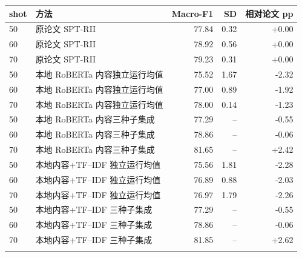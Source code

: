\begin{tabular}{llrrr}
\toprule
shot & 方法 & Macro-F1 & SD & 相对论文 pp\\
\midrule
50 & 原论文 SPT-RII & 77.84 & 0.32 & +0.00\\
60 & 原论文 SPT-RII & 78.92 & 0.56 & +0.00\\
70 & 原论文 SPT-RII & 79.23 & 0.31 & +0.00\\
50 & 本地 RoBERTa 内容独立运行均值 & 75.52 & 1.67 & -2.32\\
60 & 本地 RoBERTa 内容独立运行均值 & 77.00 & 0.89 & -1.92\\
70 & 本地 RoBERTa 内容独立运行均值 & 78.00 & 0.14 & -1.23\\
50 & 本地 RoBERTa 内容三种子集成 & 77.29 & -- & -0.55\\
60 & 本地 RoBERTa 内容三种子集成 & 78.86 & -- & -0.06\\
70 & 本地 RoBERTa 内容三种子集成 & 81.65 & -- & +2.42\\
50 & 本地内容+TF--IDF 独立运行均值 & 75.56 & 1.81 & -2.28\\
60 & 本地内容+TF--IDF 独立运行均值 & 76.89 & 0.88 & -2.03\\
70 & 本地内容+TF--IDF 独立运行均值 & 76.97 & 1.79 & -2.26\\
50 & 本地内容+TF--IDF 三种子集成 & 77.29 & -- & -0.55\\
60 & 本地内容+TF--IDF 三种子集成 & 78.86 & -- & -0.06\\
70 & 本地内容+TF--IDF 三种子集成 & 81.85 & -- & +2.62\\
\addlinespace
\multicolumn{5}{l}{\footnotesize 官方释义融合仅作标签近似信息的上限参考，不纳入主结论。}\\
\bottomrule
\end{tabular}
